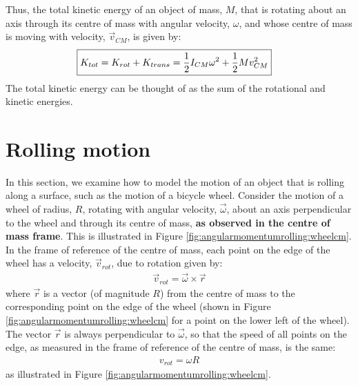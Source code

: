 Thus, the total kinetic energy of an object of mass, $M$, that is rotating about an axis through its centre of mass with angular velocity, $\omega$, and whose centre of mass is moving with velocity, $\vec v_{CM}$, is given by:
\begin{align}
\Aboxed{K_{tot}=K_{rot}+K_{trans}=\frac{1}{2} I_{CM}\omega ^2 + \frac{1}{2}M v_{CM}^2} 
\end{align}
The total kinetic energy can be thought of as the sum of the rotational and kinetic energies.


\section{Rolling motion}
In this section, we examine how to model the motion of an object that is rolling along a surface, such as the motion of a bicycle wheel. Consider the motion of a wheel of radius, $R$, rotating with angular velocity, $\vec\omega$, about an axis perpendicular to the wheel and through its centre of mass, \textbf{as observed in the centre of mass frame}. This is illustrated in Figure \ref{fig:angularmomentumrolling:wheelcm}.
In the frame of reference of the centre of mass, each point on the edge of the wheel has a velocity, $\vec v_{rot}$, due to rotation given by:
\begin{align*}
\vec v_{rot} = \vec \omega\times \vec r 
\end{align*}
where $\vec r$ is a vector (of magnitude $R$) from the centre of mass to the corresponding point on the edge of the wheel (shown in Figure \ref{fig:angularmomentumrolling:wheelcm} for a point on the lower left of the wheel). The vector $\vec r$ is always perpendicular to $\vec \omega$, so that the speed of all points on the edge, as measured in the frame of reference of the centre of mass, is the same:
\begin{align}
\label{eq:angularmomentumrolling:vrot}
v_{rot} = \omega R
\end{align} 
as illustrated in Figure \ref{fig:angularmomentumrolling:wheelcm}.

